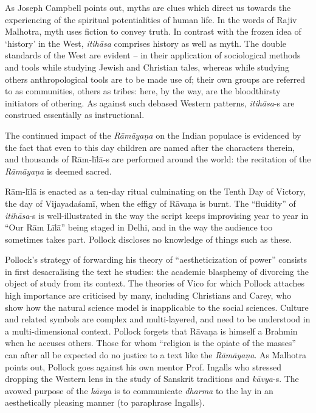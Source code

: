 \vskip -2pt

As Joseph Campbell points out, myths are clues which direct us towards the experiencing of the spiritual potentialities of human life. In the words of Rajiv Malhotra, myth uses fiction to convey truth. In contrast with the frozen idea of ‘history’ in the West, \textit{itihāsa} comprises history as well as myth. The double standards of the West are evident – in their application of sociological methods and tools while studying Jewish and Christian tales, whereas while studying others anthropological tools are to be made use of; their own groups are referred to as communities, others as tribes: here, by the way, are the bloodthirsty initiators of othering. As against such debased Western patterns, \textit{itihāsa}-s are construed essentially as instructional.

\vskip -2pt

The continued impact of the \textit{Rāmāyaṇa} on the Indian populace is evidenced by the fact that even to this day children are named after the characters therein, and thousands of Rām-līlā-s are performed around the world: the recitation of the \textit{Rāmāyaṇa} is deemed sacred.

\vskip -2pt

Rām-līlā is enacted as a ten-day ritual culminating on the Tenth Day of Victory, the day of Vijayadaśamī, when the effigy of Rāvaṇa is burnt. The “fluidity” of \textit{itihāsa}-s is well-illustrated in the way the script keeps improvising year to year in “Our Rām Līlā” being staged in Delhi, and in the way the audience too sometimes takes part. Pollock discloses no knowledge of things such as these.

Pollock’s strategy of forwarding his theory of “aestheticization of power” consists in first desacralising the text he studies: the academic blasphemy of divorcing the object of study from its context. The theories of Vico for which Pollock attaches high importance are criticised by many, including Christians and Carey, who show how the natural science model is inapplicable to the social sciences. Culture and related symbols are complex and multi-layered, and need to be understood in a multi-dimensional context. Pollock forgets that Rāvaṇa is himself a Brahmin when he accuses others. Those for whom “religion is the opiate of the masses” can after all be expected do no justice to a text like the \textit{Rāmāyaṇa}. As Malhotra points out, Pollock goes against his own mentor Prof. Ingalls who stressed dropping the Western lens in the study of Sanskrit traditions and \textit{kāvya}-s. The avowed purpose of the \textit{kāvya} is to communicate \textit{dharma} to the lay in an aesthetically pleasing manner (to paraphrase Ingalls).


